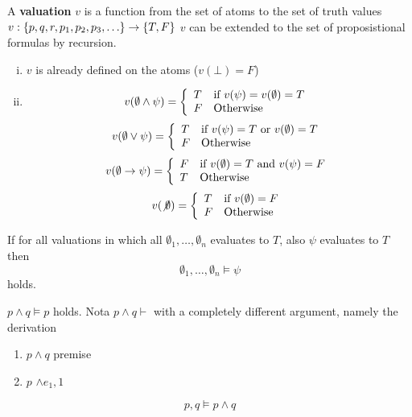 \documentclass[12pt]{report}
\newcommand{\If}{\text{if }}
\begin{document}
\begin{skgr}[1.28, p 37]

A \textbf{valuation} $v$ is a function from the set of atoms to the set of truth
values
$v: \set{p,q,r, p_1, p_2, p_3, \dotsc} \to \set{T,F}$
$v$ can be extended to the set of proposistional formulas by recursion.

\begin{enumerate}[(i)]
\item $v$ is already defined on the atoms ($v(\bot) = F$)
\item
    \[v(\emptyset \wedge \psi) = \bcondef T & \If v(\psi) = v(\emptyset) = T \\ F
    & \text{Otherwise} \econdef \\\]
    \[v(\emptyset \vee \psi) = \bcondef T & \If v(\psi) = T \text{ or } v(\emptyset) = T \\ F
    & \text{Otherwise} \econdef \\\]
    \[v(\emptyset \to \psi) = \bcondef F & \If v(\emptyset) = T \text{ and } v(\psi) = F \\ T
    & \text{Otherwise} \econdef \\\]
    \[v(\not \emptyset ) = \bcondef T & \If v(\emptyset) = F \\ F
    & \text{Otherwise} \econdef \\\]

\end{enumerate}
\end{skgr}

\begin{skgr}[1.34, p 46]

If for all valuations in which all $\emptyset_1,\dotsc, \emptyset_n$ evaluates
to $T$, also $\psi$ evaluates to $T$ then \[\emptyset_1, \dotsc, \emptyset_n
\models \psi\]
holds.
\end{skgr}

\begin{daemi}
  $p \wedge q \models p$ holds.
Nota $p \wedge q \vdash$ with a completely different argument, namely the
derivation
\begin{enumerate}[1.]
\item $p \wedge q$ premise
\item \(p\)     $\wedge e_1, 1$
\end{enumerate}

\end{daemi}

\begin{daemi}
  \[ p,q \models p \wedge q \]
\end{daemi}
\end{document}
